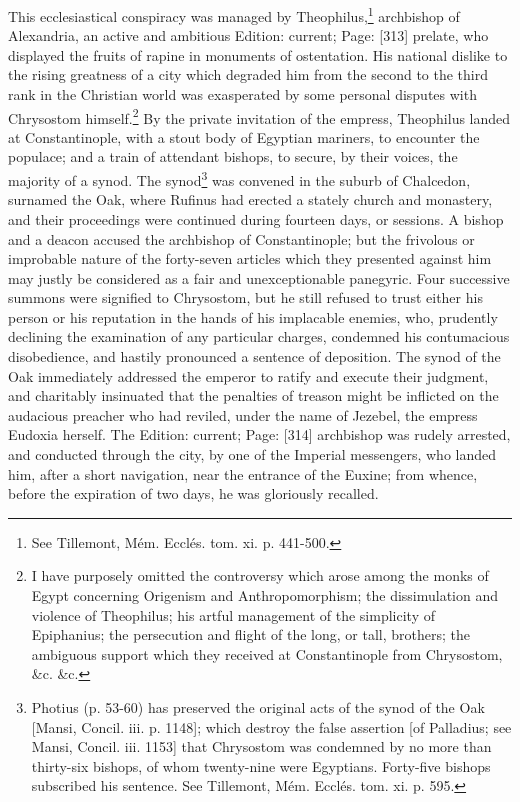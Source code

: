 This ecclesiastical conspiracy was managed by Theophilus,\footnote{See Tillemont, Mém. Ecclés. tom. xi. p. 441-500.} archbishop of Alexandria, an active and ambitious Edition: current; Page: [313] prelate, who displayed the fruits of rapine in monuments of ostentation. His national dislike to the rising greatness of a city which degraded him from the second to the third rank in the Christian world was exasperated by some personal disputes with Chrysostom himself.\footnote{I have purposely omitted the controversy which arose among the monks of Egypt concerning Origenism and Anthropomorphism; the dissimulation and violence of Theophilus; his artful management of the simplicity of Epiphanius; the persecution and flight of the long, or tall, brothers; the ambiguous support which they received at Constantinople from Chrysostom, \&c. \&c.} By the private invitation of the empress, Theophilus landed at Constantinople, with a stout body of Egyptian mariners, to encounter the populace; and a train of attendant bishops, to secure, by their voices, the majority of a synod. The synod\footnote{Photius (p. 53-60) has preserved the original acts of the synod of the Oak [Mansi, Concil. iii. p. 1148]; which destroy the false assertion [of Palladius; see Mansi, Concil. iii. 1153] that Chrysostom was condemned by no more than thirty-six bishops, of whom twenty-nine were Egyptians. Forty-five bishops subscribed his sentence. See Tillemont, Mém. Ecclés. tom. xi. p. 595.} was convened in the suburb of Chalcedon, surnamed the Oak, where Rufinus had erected a stately church and monastery, and their proceedings were continued during fourteen days, or sessions. A bishop and a deacon accused the archbishop of Constantinople; but the frivolous or improbable nature of the forty-seven articles which they presented against him may justly be considered as a fair and unexceptionable panegyric. Four successive summons were signified to Chrysostom, but he still refused to trust either his person or his reputation in the hands of his implacable enemies, who, prudently declining the examination of any particular charges, condemned his contumacious disobedience, and hastily pronounced a sentence of deposition. The synod of the Oak immediately addressed the emperor to ratify and execute their judgment, and charitably insinuated that the penalties of treason might be inflicted on the audacious preacher who had reviled, under the name of Jezebel, the empress Eudoxia herself. The Edition: current; Page: [314] archbishop was rudely arrested, and conducted through the city, by one of the Imperial messengers, who landed him, after a short navigation, near the entrance of the Euxine; from whence, before the expiration of two days, he was gloriously recalled.

